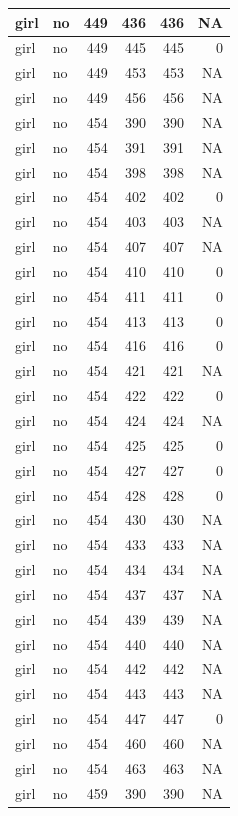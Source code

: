 \documentclass[man]{apa6}
\begin{document}
\begin{tabular}{l|l|r|r|r|r}
\hline
girl & no & 449 & 436 & 436 & NA\\
\hline
girl & no & 449 & 445 & 445 & 0\\
\hline
girl & no & 449 & 453 & 453 & NA\\
\hline
girl & no & 449 & 456 & 456 & NA\\
\hline
girl & no & 454 & 390 & 390 & NA\\
\hline
girl & no & 454 & 391 & 391 & NA\\
\hline
girl & no & 454 & 398 & 398 & NA\\
\hline
girl & no & 454 & 402 & 402 & 0\\
\hline
girl & no & 454 & 403 & 403 & NA\\
\hline
girl & no & 454 & 407 & 407 & NA\\
\hline
girl & no & 454 & 410 & 410 & 0\\
\hline
girl & no & 454 & 411 & 411 & 0\\
\hline
girl & no & 454 & 413 & 413 & 0\\
\hline
girl & no & 454 & 416 & 416 & 0\\
\hline
girl & no & 454 & 421 & 421 & NA\\
\hline
girl & no & 454 & 422 & 422 & 0\\
\hline
girl & no & 454 & 424 & 424 & NA\\
\hline
girl & no & 454 & 425 & 425 & 0\\
\hline
girl & no & 454 & 427 & 427 & 0\\
\hline
girl & no & 454 & 428 & 428 & 0\\
\hline
girl & no & 454 & 430 & 430 & NA\\
\hline
girl & no & 454 & 433 & 433 & NA\\
\hline
girl & no & 454 & 434 & 434 & NA\\
\hline
girl & no & 454 & 437 & 437 & NA\\
\hline
girl & no & 454 & 439 & 439 & NA\\
\hline
girl & no & 454 & 440 & 440 & NA\\
\hline
girl & no & 454 & 442 & 442 & NA\\
\hline
girl & no & 454 & 443 & 443 & NA\\
\hline
girl & no & 454 & 447 & 447 & 0\\
\hline
girl & no & 454 & 460 & 460 & NA\\
\hline
girl & no & 454 & 463 & 463 & NA\\
\hline
girl & no & 459 & 390 & 390 & NA\\

\end{tabular}
\end{document}
